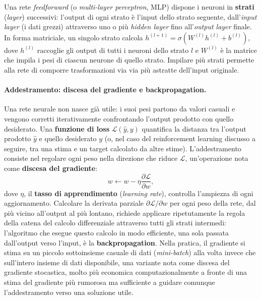 Una rete \emph{feedforward} (o \emph{multi-layer perceptron}, MLP)
dispone i neuroni in \textbf{strati} (\emph{layer}) successivi: l'output
di ogni strato è l'input dello strato seguente, dall'\emph{input layer}
(i dati grezzi) attraverso uno o più \emph{hidden layer} fino
all'\emph{output layer} finale. In forma matriciale, un singolo strato
calcola $h^{(l+1)} = \sigma\!\left(W^{(l)} h^{(l)} + b^{(l)}\right)$, dove
$h^{(l)}$ raccoglie gli output di tutti i neuroni dello strato $l$ e
$W^{(l)}$ è la matrice che impila i pesi di ciascun neurone di quello
strato. Impilare più strati permette alla rete di comporre trasformazioni
via via più astratte dell'input originale.

\paragraph{Addestramento: discesa del gradiente e backpropagation.} Una
rete neurale non nasce già utile: i suoi pesi partono da valori casuali e
vengono corretti iterativamente confrontando l'output prodotto con quello
desiderato. Una \textbf{funzione di loss} $\mathcal{L}(\hat y, y)$
quantifica la distanza tra l'output prodotto $\hat y$ e quello desiderato
$y$ (o, nel caso del reinforcement learning discusso a seguire, tra una
stima e un target calcolato da altre stime). L'addestramento consiste nel
regolare ogni peso nella direzione che riduce $\mathcal{L}$, un'operazione
nota come \textbf{discesa del gradiente}:
\[w \leftarrow w - \eta \frac{\partial \mathcal{L}}{\partial w},\]
dove $\eta$, il \textbf{tasso di apprendimento} (\emph{learning rate}),
controlla l'ampiezza di ogni aggiornamento. Calcolare la derivata parziale
$\partial \mathcal{L}/\partial w$ per ogni peso della rete, dal più vicino
all'output al più lontano, richiede applicare ripetutamente la regola
della catena del calcolo differenziale attraverso tutti gli strati
intermedi: l'algoritmo che esegue questo calcolo in modo efficiente, una
sola passata dall'output verso l'input, è la \textbf{backpropagation}.
Nella pratica, il gradiente si stima su un piccolo sottoinsieme casuale di
dati (\emph{mini-batch}) alla volta invece che sull'intero insieme di
dati disponibile, una variante nota come discesa del gradiente
stocastica, molto più economica computazionalmente a fronte di una stima
del gradiente più rumorosa ma sufficiente a guidare comunque
l'addestramento verso una soluzione utile.

